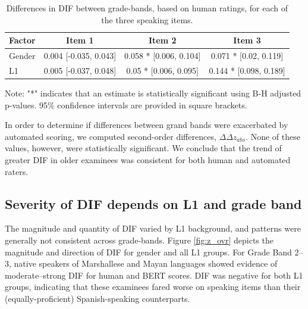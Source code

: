 \documentclass [PhD] {uclathes}
\begin{document}
\begin{table}[htbp]
\centering
\caption{\label{gr_diff}
Differences in DIF between grade-bands, based on human ratings, for each of the three speaking items. }
\small  %
\begin{tabular}{lccc}
\toprule
\textbf{Factor} & \textbf{Item 1} & \textbf{Item 2} & \textbf{Item 3} \\
\midrule
Gender & 0.004 [-0.035, 0.043] & 0.058 * [0.006, 0.104] & 0.071 * [0.02, 0.119] \\
L1 & 0.005 [-0.037, 0.048] & 0.05 * [0.006, 0.095] & 0.144 * [0.098, 0.189] \\
\bottomrule
\end{tabular}
{\newline \newline Note: "*" indicates that an estimate is statistically significant using B-H adjusted p-values. 95\% confidence intervals are provided in square brackets. \par}
\end{table}

In order to determine if differences between grand bands were exacerbated by automated scoring, we computed second-order differences, $\Delta \Delta z_{abs}$. None of these values, however, were statistically significant. We conclude that the trend of greater DIF in older examinees was consistent for both human and automated raters. 

\subsection{Severity of DIF depends on L1 and grade band}

The magnitude and quantity of DIF varied by L1 background, and patterns were generally not consistent across grade-bands. Figure \ref{fig:z_ovr} depicts the magnitude and direction of DIF for gender and all L1 groups. For Grade Band 2–3, native speakers of Marshallese and Mayan languages showed evidence of moderate–strong DIF for human and BERT scores. DIF was negative for both L1 groups, indicating that these examinees fared worse on speaking items than their (equally-proficient) Spanish-speaking counterparts. 
\end{document}
